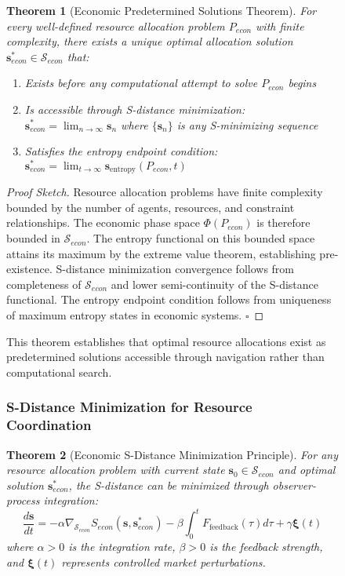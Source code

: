 \documentclass[12pt,a4paper]{article}
\newtheorem{theorem}{Theorem}
\begin{document}
\begin{figure}[H]
\begin{theorem}[Economic Predetermined Solutions Theorem]
For every well-defined resource allocation problem $P_{econ}$ with finite complexity, there exists a unique optimal allocation solution $\mathbf{s}^*_{econ} \in \mathcal{S}_{econ}$ that:
\begin{enumerate}
\item Exists before any computational attempt to solve $P_{econ}$ begins
\item Is accessible through S-distance minimization: $\mathbf{s}^*_{econ} = \lim_{n \to \infty} \mathbf{s}_n$ where $\{\mathbf{s}_n\}$ is any S-minimizing sequence
\item Satisfies the entropy endpoint condition: $\mathbf{s}^*_{econ} = \lim_{t \to \infty} \mathbf{s}_{\text{entropy}}(P_{econ}, t)$
\end{enumerate}
\end{theorem}

\begin{proof}[Proof Sketch]
Resource allocation problems have finite complexity bounded by the number of agents, resources, and constraint relationships. The economic phase space $\Phi(P_{econ})$ is therefore bounded in $\mathcal{S}_{econ}$. The entropy functional on this bounded space attains its maximum by the extreme value theorem, establishing pre-existence. S-distance minimization convergence follows from completeness of $\mathcal{S}_{econ}$ and lower semi-continuity of the S-distance functional. The entropy endpoint condition follows from uniqueness of maximum entropy states in economic systems. $\square$
\end{proof}

This theorem establishes that optimal resource allocations exist as predetermined solutions accessible through navigation rather than computational search.

\subsubsection{S-Distance Minimization for Resource Coordination}

\begin{theorem}[Economic S-Distance Minimization Principle]
For any resource allocation problem with current state $\mathbf{s}_0 \in \mathcal{S}_{econ}$ and optimal solution $\mathbf{s}^*_{econ}$, the S-distance can be minimized through observer-process integration:
\begin{equation}
\frac{d\mathbf{s}}{dt} = -\alpha \nabla_{\mathcal{S}_{econ}} S_{econ}(\mathbf{s}, \mathbf{s}^*_{econ}) - \beta \int_0^t F_{\text{feedback}}(\tau) d\tau + \gamma \mathbf{\xi}(t)
\end{equation}
where $\alpha > 0$ is the integration rate, $\beta > 0$ is the feedback strength, and $\mathbf{\xi}(t)$ represents controlled market perturbations.
\end{theorem}


\end{figure}
\end{document}
